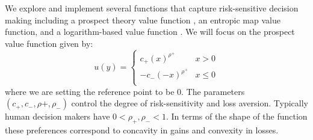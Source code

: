 \documentclass{article}
\begin{document}
We explore and implement several functions that capture risk-sensitive decision making including a prospect theory value function \cite{tversky1992advances}, an entropic map value function, and a logarithm-based value function \cite{DBLP:journals/corr/RatliffM17}. We will focus on the prospect value function given by:
\begin{equation}u(y) = 
\begin{cases}
c_+ (x)^{\rho^+} & x > 0 \\
-c_- (-x)^{\rho^+} & x \leq 0 \\
\end{cases}
\end{equation}
where we are setting the reference point to be 0. The parameters $(c_+, c_-, \rho+, \rho_-)$ control the degree of risk-sensitivity and loss aversion. Typically human decision makers have $0 < \rho_+, \rho_- < 1$. In terms of the shape of the function these preferences correspond to concavity in gains and convexity in losses.
\end{document}
